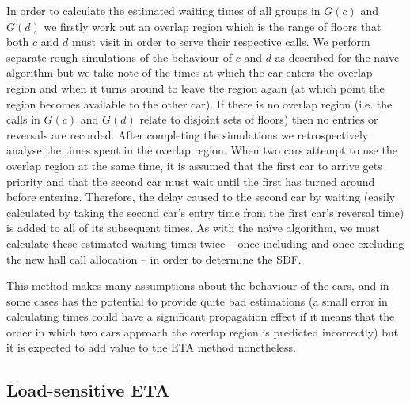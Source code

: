 \documentclass{UoYCSproject}
\begin{document}
In order to calculate the estimated waiting times of all groups in $G(c)$ and $G(d)$ we firstly work out an overlap region which is the range of floors that both $c$ and $d$ must visit in order to serve their respective calls.  We perform separate rough simulations of the behaviour of $c$ and $d$ as described for the na\"{i}ve algorithm but we take note of the times at which the car enters the overlap region and when it turns around to leave the region again (at which point the region becomes available to the other car).  If there is no overlap region (i.e. the calls in $G(c)$ and $G(d)$ relate to disjoint sets of floors) then no entries or reversals are recorded.  After completing the simulations we retrospectively analyse the times spent in the overlap region.  When two cars attempt to use the overlap region at the same time, it is assumed that the first car to arrive gets priority and that the second car must wait until the first has turned around before entering.  Therefore, the delay caused to the second car by waiting (easily calculated by taking the second car's entry time from the first car's reversal time) is added to all of its subsequent times.  As with the na\"{i}ve algorithm, we must calculate these estimated waiting times twice -- once including and once excluding the new hall call allocation -- in order to determine the SDF.

This method makes many assumptions about the behaviour of the cars, and in some cases has the potential to provide quite bad estimations (a small error in calculating times could have a significant propagation effect if it means that the order in which two cars approach the overlap region is predicted incorrectly) but it is expected to add value to the ETA method nonetheless.

\subsection{Load-sensitive ETA}
\end{document}
